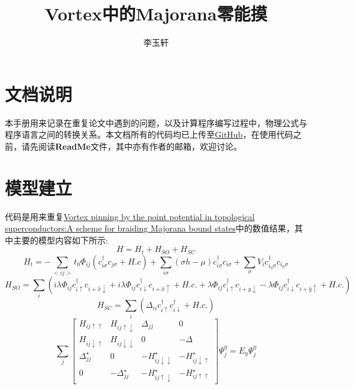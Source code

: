\documentclass[a4paper,12pt]{ctexart}
\author{李玉轩}
\title{Vortex中的Majorana零能摸}
\numberwithin{equation}{section}
\begin{document}
\maketitle
%
\section{文档说明}
本手册用来记录在重复论文中遇到的问题，以及计算程序编写过程中，物理公式与程序语言之间的转换关系。本文档所有的代码均已上传至\href{https://github.com/yxli8023/BdG}{GitHub}，在使用代码之前，请先阅读\textbf{ReadMe}文件，其中亦有作者的邮箱，欢迎讨论。
\section{模型建立}
代码是用来重复\href{https://github.com/yxli8023/BdG/blob/master/article/PhysRevB.96.184508.pdf}{Vortex pinning by the point potential in topological superconductors:A scheme for braiding Majorana bound states}中的数值结果，其中主要的模型内容如下所示:
\begin{equation}
H = H_t+H_{SO}+H_{SC}
\end{equation}
\begin{equation}
H_t = -\sum_{<ij>}t_0\Phi_{ij}(c_{i\sigma}^\dagger c_{j\sigma}+H.c)+\sum_{i\sigma}(\sigma h-\mu)c_{i\sigma}^\dagger c_{i\sigma}+\sum_\sigma V_ic_{i_0\sigma}^\dagger c_{i_0\sigma}\label{eqhop}
\end{equation}
\begin{equation}
H_{SO}=\sum_{i}(i\lambda\Phi_{ij} c_{i\uparrow}^\dagger c_{i+\hat{x}\downarrow}+i\lambda\Phi_{ij} c_{i\downarrow}^\dagger c_{i+\hat{x}\uparrow}+H.c.
+\lambda\Phi_{ij}c_{i\uparrow}^\dagger c_{i+\hat{y}\downarrow}
-\lambda\Phi_{ij}c_{i\downarrow}^\dagger c_{i+\hat{y}\uparrow}+H.c.)\label{eqsoc}
\end{equation}
\begin{equation}
H_{SC}=\sum_i(\Delta_{ii}c_{i\uparrow}^\dagger c_{i\downarrow}^\dagger+H.c.)
\end{equation}
\begin{equation}
\sum_j 
\left[
\begin{array}{cccc}
H_{ij\uparrow\uparrow}&H_{ij\uparrow\downarrow}&\Delta_{jj}&0\\
H_{ij\downarrow\uparrow}&H_{ij\downarrow\downarrow}&0&-\Delta\\
\Delta_{jj}^\star&0&-H_{ij\downarrow\downarrow}^\star&-H_{ij\downarrow\uparrow}^\star\\
0&-\Delta_{jj}^\star&-H_{ij\uparrow\downarrow}^\star&-H_{ij\uparrow\uparrow}^\star
\end{array}
\right] \Psi_j^\eta=E_\eta\Psi_j^\eta\label{eq:5}
\end{equation}
\end{document}
